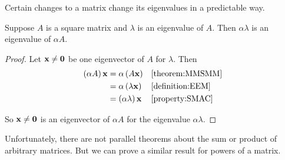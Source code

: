 \documentclass{ximera}
\begin{document}
Certain changes to a matrix change its eigenvalues in a predictable way.

\begin{theorem}
\label{theorem:ESMM}

Suppose $A$ is a square matrix and $\lambda$ is an eigenvalue of $A$.
Then $\alpha\lambda$ is an eigenvalue of $\alpha A$.

\begin{proof}
Let $\mathbf{x}\neq\mathbf{0}$ be one eigenvector of $A$ for $\lambda$.  Then
\begin{align*}
\left(\alpha A\right)\mathbf{x}&=\alpha\left(A\mathbf{x}\right)&&\ref{theorem:MMSMM}\\
&=\alpha\left(\lambda\mathbf{x}\right)&&\ref{definition:EEM}\\
&=\left(\alpha\lambda\right)\mathbf{x}&&\ref{property:SMAC}
\end{align*}

So $\mathbf{x}\neq\mathbf{0}$ is an eigenvector of $\alpha A$ for the eigenvalue $\alpha\lambda$.

\end{proof}
\end{theorem}

Unfortunately, there are not parallel theorems about the sum or product of arbitrary matrices.  But we can prove a similar result for powers of a matrix.
\end{document}
